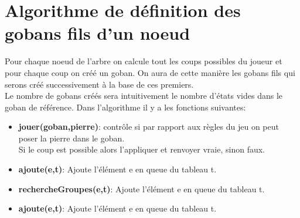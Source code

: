     \section{Algorithme de définition des gobans fils d'un noeud}
    Pour chaque noeud de l'arbre on calcule tout les coups possibles du joueur et pour chaque coup on créé un goban. On aura de cette manière les gobans fils qui serons créé successivement à la base de ces premiers.\\
    Le nombre de gobans créés sera intuitivement le nombre d'états vides dans le goban de référence.
    Dans l'algorithme il y a les fonctions suivantes:\\
    \begin{itemize}
    \item \textbf{jouer(goban,pierre)}:
    contrôle si par rapport aux règles du jeu on peut poser la pierre dans le goban.\\
    Si le coup est possible alors l'appliquer et renvoyer vraie, sinon faux.
    \item \textbf{ajoute(e,t)}:
    Ajoute l'élément e en queue du tableau t.
    \item \textbf{rechercheGroupes(e,t)}:
    Ajoute l'élément e en queue du tableau t.
    \item \textbf{ajoute(e,t)}:
    Ajoute l'élément e en queue du tableau t.
    \end{itemize}
    
    
